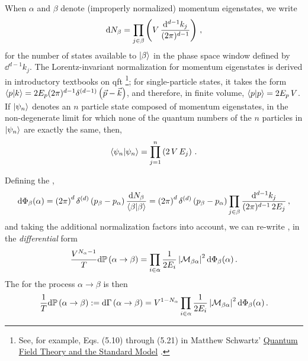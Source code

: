 When \(\alpha\) and \(\beta\) denote (improperly normalized) momentum eigenstates, we write
\begin{align}
    \dd N_\beta = \prod_{j \in \beta}\left(V \, \frac{\dd^{d-1} k_j}{(2\pi)^{d-1}}\right)
    \,,
\end{align}
for the number of states available to \(\ket{\beta}\) in the phase space window defined by \(\dd^{d-1} k_j\).
%
The Lorentz-invariant normalization for momentum eigenstates is derived in introductory textbooks on \gls{qft}%
\footnote{
    See, for example, Eqs. (5.10) through (5.21) in Matthew Schwartz' \underline{Quantum Field Theory and the Standard Model} \cite{}.
};
%
for single-particle states, it takes the form \(\braket{p}{k} = 2 E_p (2\pi)^{d-1} \delta^{(d-1)}\left(\vec{p} - \vec{k}\right)\), and therefore, in finite volume, \(\braket{p}{p} = 2 E_p \, V\).
%
If \(\ket{\psi_n}\) denotes an \(n\) particle state composed of momentum eigenstates, in the non-degenerate limit for which none of the quantum numbers of the \(n\) particles in \(\ket{\psi_n}\) are exactly the same, then,
\begin{align}
    \braket{\psi_n}{\psi_n}
    =
    \prod_{j = 1}^n \left(2 \, V\, E_j\right)
    \,.
\end{align}

Defining the ,
\begin{align}
   \dd\Phi_\beta(\alpha)
   =
   \left(2\pi\right)^d \delta^{(d)}\left(p_\beta - p_\alpha\right)
   \frac{\dd N_\beta}{\braket{\beta}{\beta}}
   =
   \left(2\pi\right)^d \delta^{(d)}\left(p_\beta - p_\alpha\right)
   \prod_{j \in \beta}
    \frac{\dd^{d-1} k_j}{(2\pi)^{d-1}\, 2 E_j}
   \,,
\end{align}
and taking the additional normalization factors into account, we can re-write , in the \textit{differential} form
\begin{align}
    \frac{V^{N_\alpha - 1}}{T}
    \dd \mathbb{P}\left(\alpha \to \beta\right)
    =
    \prod_{i \in \alpha} \frac{1}{2 E_i}
    \,
    \abs{\mathcal{M}_{\beta\alpha}}^2
    \,
    \dd \Phi_\beta(\alpha)
    \,.
\end{align}
The  for the process \(\alpha \to \beta\) is then
\begin{align}
    \label{eq:differential-rate}
    \frac{1}{T}
    \dd \mathbb{P}\le(\alpha \to \beta\ri)
    :=
    \dd \Gamma\le(\alpha \to \beta\ri)
    =
    V^{1 - N_{\alpha}}
    \prod_{i \in \alpha} \frac{1}{2 E_i}
    \,
    \abs{\mathcal{M}_{\beta\alpha}}^2
    \,
    \dd \Phi_\beta(\alpha)
    \,.
\end{align}


